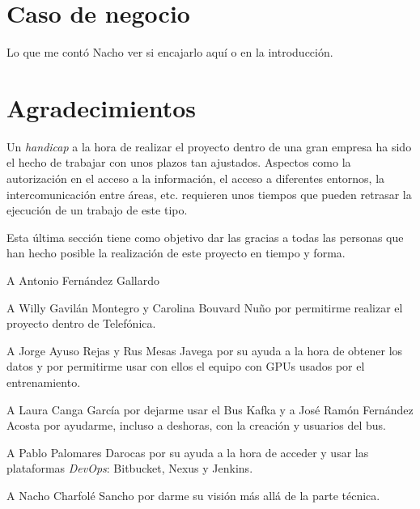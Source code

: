 \section{Caso de negocio}
Lo que me contó Nacho ver si encajarlo aquí o en la introducción. 

\section{Agradecimientos}

Un \textit{handicap} a la hora de realizar el proyecto dentro de una gran empresa ha sido el hecho de trabajar con unos plazos tan ajustados. Aspectos como la autorización en el acceso a la información, el acceso a diferentes entornos, la intercomunicación entre áreas, etc. requieren unos tiempos que pueden retrasar la ejecución de un trabajo de este tipo. 
 
Esta última sección tiene como objetivo dar las gracias a todas las personas que han hecho posible la realización de este proyecto en tiempo y forma.

A Antonio Fernández Gallardo

A Willy Gavilán Montegro y Carolina Bouvard Nuño por permitirme realizar el proyecto dentro de Telefónica.

A Jorge Ayuso Rejas y Rus Mesas Javega por su ayuda a la hora de obtener los datos y por permitirme usar con ellos el equipo con GPUs usados por el entrenamiento. 

A Laura Canga García por dejarme usar el Bus Kafka y a José Ramón Fernández Acosta por ayudarme, incluso a deshoras, con la creación y usuarios del bus. 

A Pablo Palomares Darocas por su ayuda a la hora de acceder y usar las plataformas \textit{DevOps}: Bitbucket, Nexus y Jenkins.

A Nacho Charfolé Sancho por darme su visión más allá de la parte técnica.

 